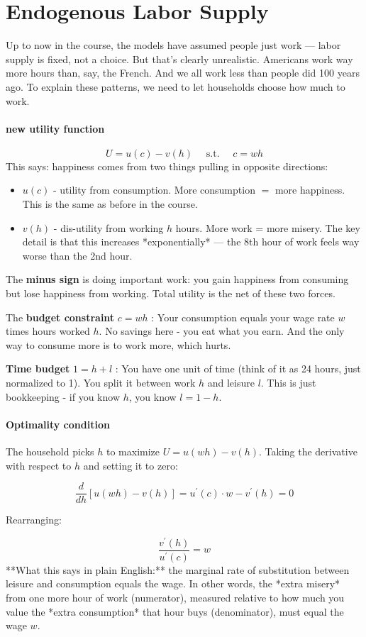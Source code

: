 \documentclass[12pt]{article}
\begin{document}
\section{Endogenous Labor Supply}
Up to now in the course, the models have assumed people just work — labor supply is fixed, not a choice. But that's clearly unrealistic. Americans work way more hours than, say, the French. And we all work less than people did 100 years ago. To explain these patterns, we need to let households choose how much to work.
\paragraph{new utility function}
$$
U=u(c)-v(h) \quad \text { s.t. } \quad c=w h
$$
This says: happiness comes from two things pulling in opposite directions:
\begin{itemize}
    \item $u(c)$ - utility from consumption. More consumption $=$ more happiness. This is the same as before in the course.
    \item $v(h)$ - dis-utility from working $h$ hours. More work = more misery. The key detail is that this increases *exponentially* — the 8th hour of work feels way worse than the 2nd hour.
\end{itemize}
The \textbf{minus sign} is doing important work: you gain happiness from consuming but lose happiness from working. Total utility is the net of these two forces.

The \textbf{budget constraint} $c=w h$ : Your consumption equals your wage rate $w$ times hours worked $h$. No savings here - you eat what you earn. And the only way to consume more is to work more, which hurts.

\textbf{Time budget} $1=h+l$ : You have one unit of time (think of it as 24 hours, just normalized to 1). You split it between work $h$ and leisure $l$. This is just bookkeeping - if you know $h$, you know $l=1-h$.

\paragraph{Optimality condition}
The household picks $h$ to maximize $U=u(w h)-v(h)$. Taking the derivative with respect to $h$ and setting it to zero:

$$
\frac{d}{d h}[u(w h)-v(h)]=u^{\prime}(c) \cdot w-v^{\prime}(h)=0
$$


Rearranging:

$$
\frac{v^{\prime}(h)}{u^{\prime}(c)}=w
$$
**What this says in plain English:** the marginal rate of substitution between leisure and consumption equals the wage. In other words, the *extra misery* from one more hour of work (numerator), measured relative to how much you value the *extra consumption* that hour buys (denominator), must equal the wage $w$.
\end{document}
